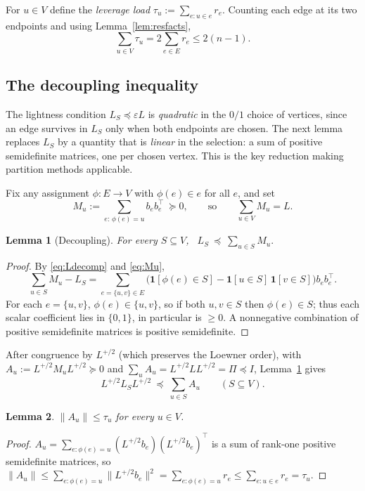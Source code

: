 \documentclass[12pt]{article}
\newtheorem{lemma}{Lemma}
\theoremstyle{definition}
\newcommand{\eps}{\varepsilon}
\newcommand{\psd}{\succeq 0}
\begin{document}
For $u\in V$ define the \emph{leverage load} $\tau_u:=\sum_{e:u\in e}r_e$. Counting each edge at its
two endpoints and using Lemma~\ref{lem:resfacts},
\begin{equation}\label{eq:tau}
\sum_{u\in V}\tau_u=2\sum_{e\in E}r_e\le 2(n-1).
\end{equation}

\subsection*{The decoupling inequality}

The lightness condition $L_S\preceq\eps L$ is \emph{quadratic} in the $0/1$ choice of vertices,
since an edge survives in $L_S$ only when both endpoints are chosen. The next lemma replaces $L_S$ by
a quantity that is \emph{linear} in the selection: a sum of positive semidefinite matrices, one per
chosen vertex. This is the key reduction making partition methods applicable.

Fix any assignment $\phi:E\to V$ with $\phi(e)\in e$ for all $e$, and set
\begin{equation}\label{eq:Mu}
M_u:=\sum_{e:\,\phi(e)=u} b_e b_e^\top\ \psd ,\qquad\text{so}\qquad \sum_{u\in V}M_u=L .
\end{equation}

\begin{lemma}[Decoupling]\label{lem:decouple}
For every $S\subseteq V$, \ $\displaystyle L_S\ \preceq\ \sum_{u\in S} M_u .$
\end{lemma}
\begin{proof}
By \eqref{eq:Ldecomp} and \eqref{eq:Mu},
\[
\sum_{u\in S}M_u-L_S
=\sum_{e=\{u,v\}\in E}\Big(\mathbf 1[\phi(e)\in S]-\mathbf 1[u\in S]\,\mathbf 1[v\in S]\Big)b_eb_e^\top .
\]
For each $e=\{u,v\}$, $\phi(e)\in\{u,v\}$, so if both $u,v\in S$ then $\phi(e)\in S$; thus each scalar
coefficient lies in $\{0,1\}$, in particular is $\ge0$. A nonnegative combination of positive
semidefinite matrices is positive semidefinite.
\end{proof}

After congruence by $L^{+/2}$ (which preserves the Loewner order), with
$A_u:=L^{+/2}M_uL^{+/2}\psd$ and $\sum_{u}A_u=L^{+/2}LL^{+/2}=\Pi\preceq I$, Lemma~\ref{lem:decouple}
gives
\begin{equation}\label{eq:decouple-norm}
L^{+/2}L_S L^{+/2}\ \preceq\ \sum_{u\in S}A_u\qquad(S\subseteq V).
\end{equation}

\begin{lemma}\label{lem:Aunorm}
$\|A_u\|\le\tau_u$ for every $u\in V$.
\end{lemma}
\begin{proof}
$A_u=\sum_{e:\phi(e)=u}(L^{+/2}b_e)(L^{+/2}b_e)^\top$ is a sum of rank-one positive semidefinite
matrices, so $\|A_u\|\le\sum_{e:\phi(e)=u}\|L^{+/2}b_e\|^2=\sum_{e:\phi(e)=u}r_e\le\sum_{e:u\in e}
r_e=\tau_u$.
\end{proof}
\end{document}
